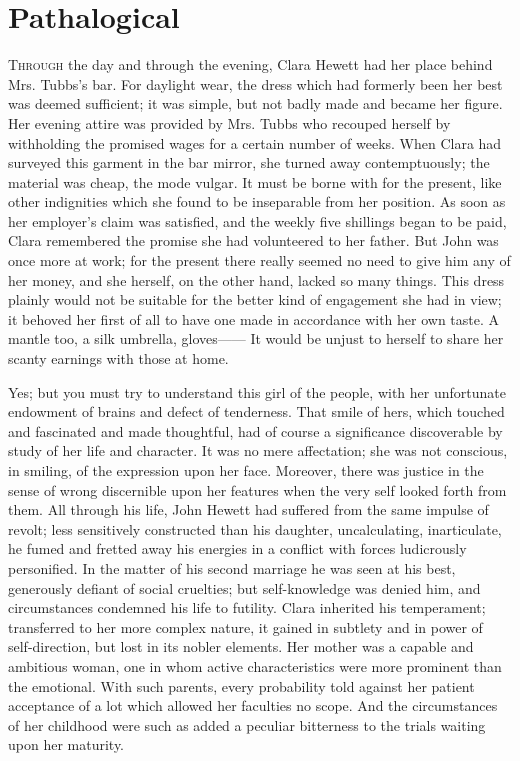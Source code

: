 \chapter{Pathalogical}

\textsc{Through} the day and through the evening, Clara Hewett had her
place behind Mrs. Tubbs's bar. For daylight wear, the dress which had
formerly been her best was deemed sufficient; it was simple, but not
badly made and became her figure. Her evening attire was provided by
Mrs. Tubbs who recouped herself by withholding the promised wages for a
certain number of weeks. When Clara had surveyed this garment in the bar
mirror, she turned away contemptuously; the material was cheap, the mode
vulgar. It must be borne with for the present, like other indignities
which she found to be inseparable from her position. As soon as her
employer's claim was satisfied, and the weekly five shillings began to
be paid, Clara remembered {\protect\hypertarget{191}{}{}}the promise she
had volunteered to her father. But John was once more at work; for the
present there really seemed no need to give him any of her money, and
she herself, on the other hand, lacked so many things. This dress
plainly would not be suitable for the better kind of engagement she had
in view; it behoved her first of all to have one made in accordance with
her own taste. A mantle too, a silk umbrella, gloves{{------}} It would
be unjust to herself to share her scanty earnings with those at home.

Yes; but you must try to understand this girl of the people, with her
unfortunate endowment of brains and defect of tenderness. That smile of
hers, which touched and fascinated and made thoughtful, had of course a
significance discoverable by study of her life and character. It was no
mere affectation; she was not conscious, in smiling, of the expression
upon her face. Moreover, there was justice in the sense of wrong
discernible upon her features when the very self looked forth from them.
All through his life, John {\protect\hypertarget{192}{}{}}Hewett had
suffered from the same impulse of revolt; less sensitively constructed
than his daughter, uncalculating, inarticulate, he fumed and fretted
away his energies in a conflict with forces ludicrously personified. In
the matter of his second marriage he was seen at his best, generously
defiant of social cruelties; but self-knowledge was denied him, and
circumstances condemned his life to futility. Clara inherited his
temperament; transferred to her more complex nature, it gained in
subtlety and in power of self-direction, but lost in its nobler
elements. Her mother was a capable and ambitious woman, one in whom
active characteristics were more prominent than the emotional. With such
parents, every probability told against her patient acceptance of a lot
which allowed her faculties no scope. And the circumstances of her
childhood were such as added a peculiar bitterness to the trials waiting
upon her maturity.

